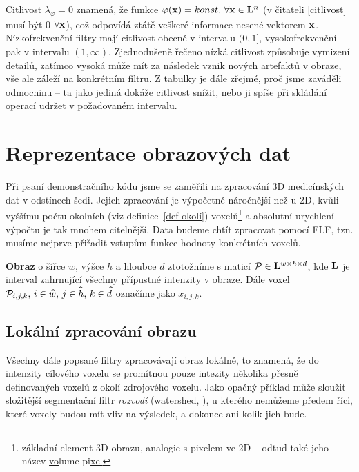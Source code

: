 Citlivost $\lambda_\varphi = 0$ znamená, že funkce $\varphi(\mathbf{x}) = konst, \, \forall \mathbf{x} \in \mathbf{L}^n$ (v čitateli \eqref{citlivost} musí být 0 $\forall \mathbf{x}$), což odpovídá ztátě veškeré informace nesené vektorem $\mathbf{x}$. Nízkofrekvenční filtry mají citlivost obecně v intervalu $(0,1]$, vysokofrekvenční pak v intervalu $(1,\infty)$. Zjednodušeně řečeno nízká citlivost způsobuje vymizení detailů, zatímco vysoká může mít za následek vznik nových artefaktů v obraze, vše ale záleží na konkrétním filtru. Z tabulky je dále zřejmé, proč jsme zaváděli odmocninu -- ta jako jediná dokáže citlivost snížit, nebo ji spíše při skládání operací udržet v požadovaném intervalu. 


\section{Reprezentace obrazových dat}

Při psaní demonstračního kódu jsme se zaměřili na zpracování 3D medicínských dat v odstínech šedi. Jejich zpracování je výpočetně náročnější než u 2D, kvůli vyššímu počtu okolních (viz definice~\ref{def okolí}) voxelů\footnote{základní element 3D obrazu, analogie s pixelem ve 2D -- odtud také jeho název \bq \underline{vo}lume-pi\underline{xel}\eq} a absolutní urychlení výpočtu je tak mnohem citelnější. Data budeme chtít zpracovat pomocí FLF, tzn. musíme nejprve přiřadit vstupům funkce hodnoty konkrétních voxelů.

\begin{define}\label{def obraz}
  \textbf{Obraz} o šířce $w$, výšce $h$ a hloubce $d$ ztotožníme s maticí $\mathcal{P} \in \mathbf{L}^{w\times h\times d}$, kde $\mathbf{L}$ je interval zahrnující všechny přípustné intenzity v obraze. Dále voxel $\mathcal{P}_{i,j,k}, \,i \in \widehat w, \,j \in \widehat h, \,k \in \widehat d$ označíme jako $x_{i,j,k}$.
\end{define}

    \subsection{Lokální zpracování obrazu}\label{lokální zprac}
    Všechny dále popsané filtry zpracovávají obraz lokálně, to znamená, že do intenzity cílového voxelu se promítnou pouze intezity několika přesně definovaných voxelů z okolí zdrojového voxelu. Jako opačný příklad může sloužit složitější segmentační filtr \emph{rozvodí} (watershed, \cite{Charypar}), u kterého nemůžeme předem říci, které voxely budou mít vliv na výsledek, a dokonce ani kolik jich bude.

